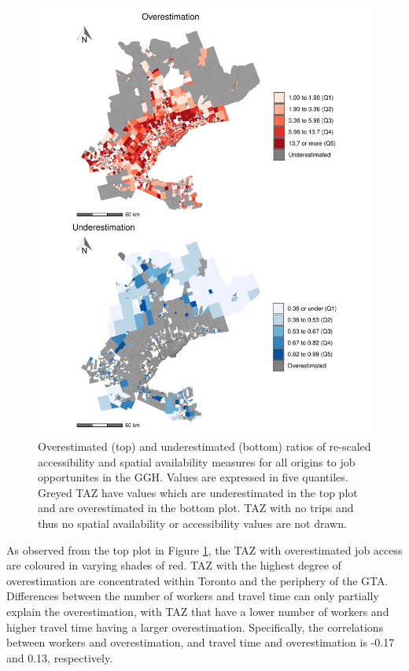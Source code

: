 \documentclass[]{elsarticle} %
\begin{document}
\begin{figure}
\includegraphics[width=1\linewidth]{Spatial-Availability_files/figure-latex/plot-difference-GGH-1} \caption{\label{fig:plot-difference-GGH}Overestimated (top) and underestimated (bottom) ratios of re-scaled accessibility and spatial availability measures for all origins to job opportunites in the GGH. Values are expressed in five quantiles. Greyed TAZ have values which are underestimated in the top plot and are overestimated in the bottom plot. TAZ with no trips and thus no spatial availability or accessibility values are not drawn.}\label{fig:plot-difference-GGH}
\end{figure}

As observed from the top plot in Figure \ref{fig:plot-difference-GGH},
the TAZ with overestimated job access are coloured in varying shades of
red. TAZ with the highest degree of overestimation are concentrated
within Toronto and the periphery of the GTA. Differences between the
number of workers and travel time can only partially explain the
overestimation, with TAZ that have a lower number of workers and higher
travel time having a larger overestimation. Specifically, the
correlations between workers and overestimation, and travel time and
overestimation is -0.17 and 0.13, respectively.
\end{document}
